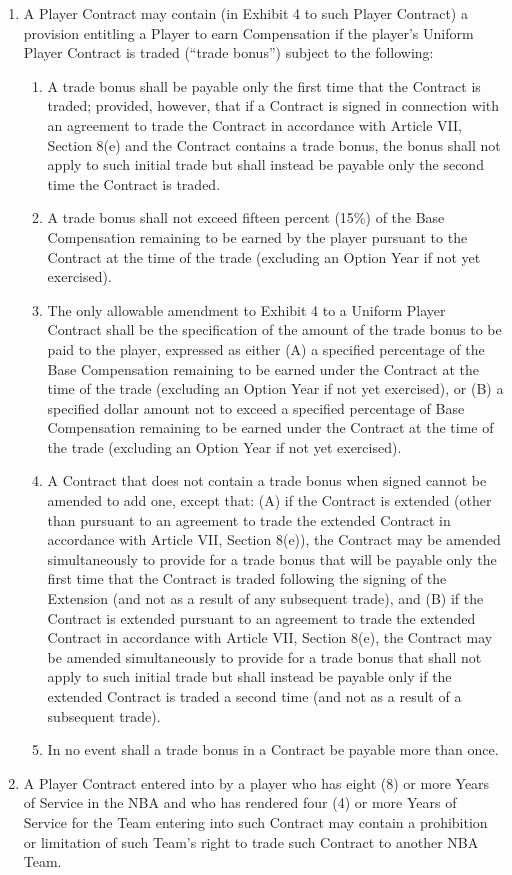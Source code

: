 \documentclass[
]{book}
\providecommand{\tightlist}{%
  \setlength{\itemsep}{0pt}\setlength{\parskip}{0pt}}
\begin{document}
\begin{enumerate}
\def\labelenumi{(\alph{enumi})}
\tightlist
\item
  A Player Contract may contain (in Exhibit 4 to such Player Contract) a provision entitling a Player to earn Compensation if the player's Uniform Player Contract is traded (``trade bonus'') subject to the following:

  \begin{enumerate}
  \def\labelenumii{(\roman{enumii})}
  \tightlist
  \item
    A trade bonus shall be payable only the first time that the Contract is traded; provided, however, that if a Contract is signed in connection with an agreement to trade the Contract in accordance with Article VII, Section 8(e) and the Contract contains a trade bonus, the bonus shall not apply to such initial trade but shall instead be payable only the second time the Contract is traded.
  \item
    A trade bonus shall not exceed fifteen percent (15\%) of the Base Compensation remaining to be earned by the player pursuant to the Contract at the time of the trade (excluding an Option Year if not yet exercised).
  \item
    The only allowable amendment to Exhibit 4 to a Uniform Player Contract shall be the specification of the amount of the trade bonus to be paid to the player, expressed as either (A) a specified percentage of the Base Compensation remaining to be earned under the Contract at the time of the trade (excluding an Option Year if not yet exercised), or (B) a specified dollar amount not to exceed a specified percentage of Base Compensation remaining to be earned under the Contract at the time of the trade (excluding an Option Year if not yet exercised).
  \item
    A Contract that does not contain a trade bonus when signed cannot be amended to add one, except that: (A) if the Contract is extended (other than pursuant to an agreement to trade the extended Contract in accordance with Article VII, Section 8(e)), the Contract may be amended simultaneously to provide for a trade bonus that will be payable only the first time that the Contract is traded following the signing of the Extension (and not as a result of any subsequent trade), and (B) if the Contract is extended pursuant to an agreement to trade the extended Contract in accordance with Article VII, Section 8(e), the Contract may be amended simultaneously to provide for a trade bonus that shall not apply to such initial trade but shall instead be payable only if the extended Contract is traded a second time (and not as a result of a subsequent trade).
  \item
    In no event shall a trade bonus in a Contract be payable more than once.
  \end{enumerate}
\item
  A Player Contract entered into by a player who has eight (8) or more Years of Service in the NBA and who has rendered four (4) or more Years of Service for the Team entering into such Contract may contain a prohibition or limitation of such Team's right to trade such Contract to another NBA Team.
\end{enumerate}
\end{document}
